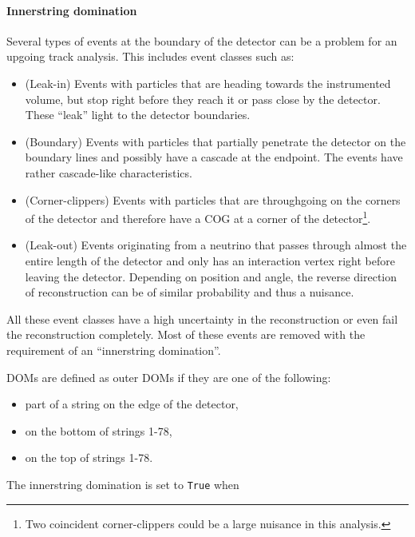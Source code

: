 \paragraph{Innerstring domination}
Several types of events at the boundary of the detector can be a problem for an upgoing track analysis. This includes event classes such as:

\vspace{2mm}
\begin{itemize}
\item (Leak-in) Events with particles that are heading towards the instrumented volume, but stop right before they reach it or pass close by the detector. These ``leak'' light to the detector boundaries.
\item (Boundary) Events with particles that partially penetrate the detector on the boundary lines and possibly have a cascade at the endpoint. The events have rather cascade-like characteristics.
\item (Corner-clippers) Events with particles that are throughgoing on the corners of the detector and therefore have a COG at a corner of the detector\footnote{Two coincident corner-clippers could be a large nuisance in this analysis.}.
\item (Leak-out) Events originating from a neutrino that passes through almost the entire length of the detector and only has an interaction vertex right before leaving the detector. Depending on position and angle, the reverse direction of reconstruction can be of similar probability and thus a nuisance.
\end{itemize}
\vspace{2mm}

\noindent All these event classes have a high uncertainty in the reconstruction or even fail the reconstruction completely. Most of these events are removed with the requirement of an ``innerstring domination''.

DOMs are defined as outer DOMs if they are one of the following:

\vspace{2mm}
\begin{itemize}
\item part of a string on the edge of the detector,
\item on the bottom of strings 1-78,
\item on the top of strings 1-78.
\end{itemize}
\vspace{2mm}

\noindent The innerstring domination is set to \texttt{True} when 

